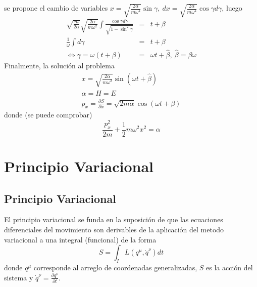 \documentclass[12pt]{report}
\begin{document}
se propone el cambio de variables $x=\sqrt{\frac{2\alpha}{m\omega^2}}\sin\gamma,\ dx=\sqrt{\frac{2\alpha}{m\omega^2}}\cos\gamma d\gamma$, luego
\begin{eqnarray}
\sqrt{\frac{m}{2\alpha}}\sqrt{\frac{2\alpha}{m\omega^2}}\int\frac{\cos\gamma d\gamma}{\sqrt{1-\sin^2\gamma}}&=&t+\beta \\
\frac{1}{\omega}\int d\gamma&=&t+\beta \\
\Leftrightarrow \gamma=\omega(t+\beta)&=&\omega t+\hat{\beta},\ \hat{\beta}=\beta\omega
\end{eqnarray}
Finalmente, la solución al problema
\begin{eqnarray}
&x=\sqrt{\displaystyle\frac{2\alpha}{m\omega^2}}\sin(\omega t+\hat{\beta})& \\&
\alpha=H=E &\\&
p_x=\displaystyle\frac{\partial S}{\partial x}=\sqrt{2m\alpha}\cos(\omega t+\beta)&
\end{eqnarray}
donde (se puede comprobar)
\begin{equation}
\frac{p_x^2}{2m}+\frac{1}{2}m\omega^2x^2=\alpha
\end{equation}

\newpage

\appendix


\chapter{ Principio  Variacional}

\section{Principio Variacional}
El principio variacional se funda en la suposición de que las ecuaciones diferenciales del movimiento son derivables de la aplicación del metodo variacional a una integral (funcional) de la forma
\begin{equation}
S=\int_I L(q^\mu,\dot{q}^\nu)dt
\end{equation}
donde $q^\mu$ corresponde al arreglo de coordenadas generalizadas, $S$ es la acción del sistema y $\dot{q}^\nu=\frac{\partial q^\nu}{\partial t}$.
\end{document}
